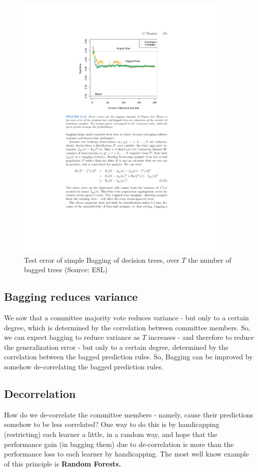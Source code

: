 \documentclass[11pt]{article}
\begin{document}
\begin{figure}[H]
  \centering
  \includegraphics[width=4in]{bagging_trees.pdf}
  \caption{Test error of simple Bagging of decision trees, over $T$ the number
    of bagged trees (Source: ESL)}
\end{figure}


\subsection{Bagging reduces variance}

We saw that a committee majority vote reduces variance - but only to a certain
degree, which is determined by the correlation between committee members. So, we
can expect bagging to reduce variance as $T$ increases - and therefore to reduce
the generalization error - but only to a certain degree, determined by the
correlation between the bagged prediction rules. So, Bagging can be improved by
somehow de-correlating the bagged prediction rules.

\subsection{Decorrelation}

How do we de-correlate the committee
members - namely, cause their predictions somehow to be less correlated? One way to
do this is by handicapping (restricting) each learner a little, in a random way, and hope that
the performance gain (in bagging them) due to de-correlation is more than the
performance loss to each learner by handicapping. The most well know example of
this principle is {\bf Random Forests.}
\end{document}
